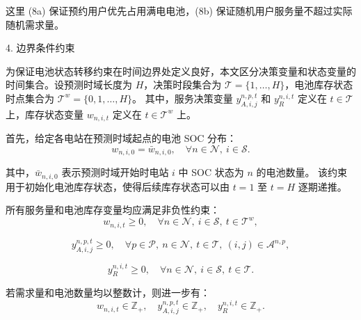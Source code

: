 \documentclass[12pt,hyperref,a4paper,UTF8]{ctexart}
\begin{document}
这里 (8a) 保证预约用户优先占用满电电池，(8b) 保证随机用户服务量不超过实际随机需求量。


4. 边界条件约束


为保证电池状态转移约束在时间边界处定义良好，本文区分决策变量和状态变量的时间集合。设预测时域长度为 $H$，决策时段集合为
$\mathcal{T}=\{1,\ldots,H\}$，电池库存状态时点集合为 $\mathcal{T}^{w}=\{0,1,\ldots,H\}$。
其中，服务决策变量 $y_{A,i,j}^{n,p,t}$ 和 $y_R^{n,i,t}$ 定义在 $t\in\mathcal{T}$ 上，库存状态变量 $w_{n,i,t}$ 定义在 $t\in\mathcal{T}^{w}$ 上。

首先，给定各电站在预测时域起点的电池 SOC 分布：
\begin{equation}
w_{n,i,0}=\bar{w}_{n,i,0},
\quad \forall n\in \mathcal{N},\ i\in \mathcal{S}.
\tag{9a}
\end{equation}

其中，$\bar{w}_{n,i,0}$ 表示预测时域开始时电站 $i$ 中 SOC 状态为 $n$ 的电池数量。
该约束用于初始化电池库存状态，使得后续库存状态可以由 $t=1$ 至 $t=H$ 逐期递推。


所有服务量和电池库存变量均应满足非负性约束：
\begin{equation}
w_{n,i,t}\ge 0,
\quad \forall n\in \mathcal{N},\ i\in \mathcal{S},\ t\in \mathcal{T}^{w},
\tag{9b}
\end{equation}

\begin{equation}
y^{n,p,t}_{A,i,j}\ge 0,
\quad \forall p\in \mathcal{P},\ n\in \mathcal{N},\ t\in \mathcal{T},\ (i,j)\in \mathcal{A}^{n,p},
\tag{9c}
\end{equation}

\begin{equation}
y^{n,i,t}_{R}\ge 0,
\quad \forall n\in \mathcal{N},\ i\in \mathcal{S},\ t\in \mathcal{T}.
\tag{9d}
\end{equation}

若需求量和电池数量均以整数计，则进一步有：
\begin{equation}
w_{n,i,t}\in \mathbb{Z}_{+},\quad
 y^{n,p,t}_{A,i,j}\in \mathbb{Z}_{+},\quad
 y^{n,i,t}_{R}\in \mathbb{Z}_{+}.
\tag{9e}
\end{equation}

\end{document}
